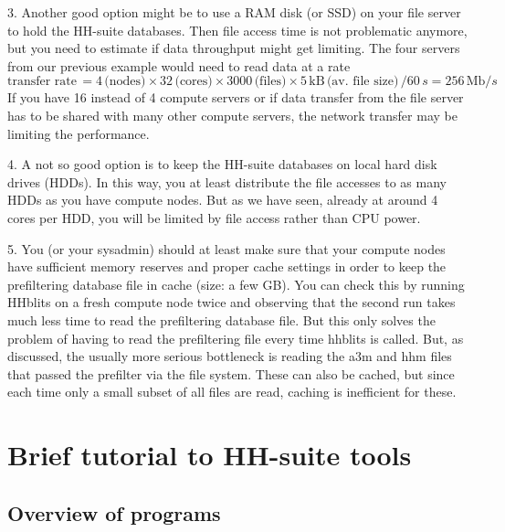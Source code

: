 \documentclass[11pt,a4paper]{article}
\begin{document}
3. Another good option might be to use a RAM disk (or SSD) on your file server to hold the 
HH-suite databases. Then file access time is not problematic anymore, but you need to estimate 
if data throughput might get limiting. The four servers from our previous example would
 need to read data at a rate 
\begin{equation}
\textrm{transfer rate}\, = 4 \, \textrm{(nodes)} \times 32\, \textrm{(cores)} \times 3000\, \textrm{(files)} \times 5\,\textrm{kB}\, \textrm{(av. file size)}\,/ 60 \,s = 256 \,\textrm{Mb}/s
\end{equation}
If you have 16 instead of 4 compute servers or if data transfer from the file server has to be 
shared with many other compute servers, the network transfer may be limiting the performance.

4. A not so good option is to keep the HH-suite databases on local hard disk drives (HDDs). In this 
way, you at least distribute the file accesses to as many HDDs as you have compute nodes. 
But as we have seen, already at around 4 cores per HDD, you will be limited by file access
rather than CPU power.

5. You (or your sysadmin) should at least make sure that your compute nodes have sufficient memory reserves 
and proper cache settings in order to keep the prefiltering database file in cache (size: a few GB).
You can check this by running HHblits on a fresh compute node twice and observing that the 
second run takes much less time to read the prefiltering database file. But this only solves
the problem of having to read the prefiltering file every time hhblits is called. But, as discussed,
the usually more serious bottleneck is reading the a3m and hhm files that passed the prefilter 
via the file system. These can also be cached, but since each time only a small subset of 
all files are read, caching is inefficient for these.


\section{Brief tutorial to HH-suite tools}

\subsection{Overview of programs}
\end{document}
